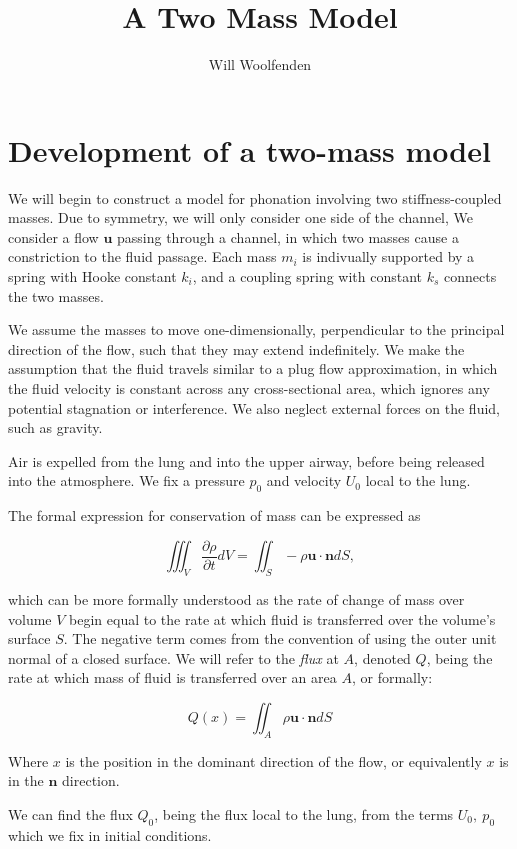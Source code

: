 \documentclass{article}
\begin{document}
\title{A Two Mass Model}
\author{Will Woolfenden}

\section{Development of a two-mass model}

We will begin to construct a model for phonation involving two stiffness-coupled masses.
Due to symmetry, we will only consider one side of the channel, 
We consider a flow $\mathbf{u}$ passing through a channel,
in which two masses cause a constriction to the fluid passage.
Each mass $m_i$ is indivually supported by a spring with Hooke constant $k_i$,
and a coupling spring with constant $k_s$ connects the two masses.

We assume the masses to move one-dimensionally, perpendicular to the principal direction of the flow,
such that they may extend indefinitely.
We make the assumption that the fluid travels similar to a plug flow approximation,
in which the fluid velocity is constant across any cross-sectional area, %
which ignores any potential stagnation or interference.
We also neglect external forces on the fluid, such as gravity.

Air is expelled from the lung and into the upper airway, before being released into the atmosphere.
We fix a pressure $p_0$ and velocity $U_0$ local to the lung.

The formal expression for conservation of mass can be expressed as

\begin{equation}
    \iiint_V \frac{\partial\rho}{\partial t}dV = \iint_S -\rho \mathbf{u}\cdotp\mathbf{n}dS,
    \label{eqn:cons_mass_formal}
\end{equation}

which can be more formally understood as the rate of change of mass over volume $V$ begin equal to the rate at which fluid is transferred over the volume's surface $S$. 
The negative term comes from the convention of using the outer unit normal of a closed surface.
We will refer to the \textit{flux} at $A$, denoted $Q$, being the rate at which mass of fluid is transferred over an area $A$, or formally:

\begin{equation}
    Q(x) = \iint_A \rho \mathbf{u}\cdotp\mathbf{n}dS
\end{equation}

Where $x$ is the position in the dominant direction of the flow, or equivalently $x$ is in the $\mathbf{n}$ direction.

We can find the flux $Q_0$, being the flux local to the lung, from the terms $U_0,~p_0$ which we fix in initial conditions.
\end{document}
